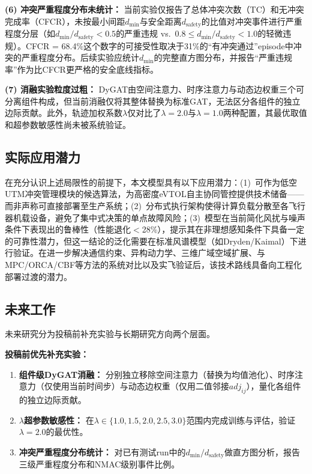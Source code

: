 \documentclass[12pt,a4paper,UTF8]{ctexart}
\begin{document}
\textbf{(6) 冲突严重程度分布未统计：} 当前实验仅报告了总体冲突次数（TC）和无冲突完成率（CFCR），未按最小间距$d_{\min}$与安全距离$d_{\text{safety}}$的比值对冲突事件进行严重程度分层（如$d_{\min}/d_{\text{safety}} < 0.5$的严重违规 vs.\ $0.8 \leq d_{\min}/d_{\text{safety}} < 1.0$的轻微违规）。CFCR = 68.4\%这个数字的可接受性取决于31\%的``有冲突通过''episode中冲突的严重程度分布。后续实验应统计$d_{\min}$的完整直方图分布，并报告``严重违规率''作为比CFCR更严格的安全底线指标。

\textbf{(7) 消融实验粒度过粗：} DyGAT由空间注意力、时序注意力与动态边权重三个可分离组件构成，但当前消融仅将其整体替换为标准GAT，无法区分各组件的独立边际贡献。此外，轨迹加权系数$\lambda$仅对比了$\lambda=2.0$与$\lambda=1.0$两种配置，其最优取值和超参数敏感性尚未被系统验证。

\subsection{实际应用潜力}

在充分认识上述局限性的前提下，本文模型具有以下应用潜力：(1)~可作为低空UTM冲突管理模块的候选算法，为高密度eVTOL自主协同管控提供技术储备——而非声称可直接部署至生产系统；(2)~分布式执行架构使得计算负载分散至各飞行器机载设备，避免了集中式决策的单点故障风险；(3)~模型在当前简化风扰与噪声条件下表现出的鲁棒性（性能退化$<$28\%），提示其在非理想感知条件下具备一定的可靠性潜力，但这一结论的泛化需要在标准风谱模型（如Dryden/Kaimal）下进行验证。在进一步解决通信约束、异构动力学、三维广域空域扩展、与MPC/ORCA/CBF等方法的系统对比以及实飞验证后，该技术路线具备向工程化部署过渡的潜力。

\subsection{未来工作}

未来研究分为投稿前补充实验与长期研究方向两个层面。

\textbf{投稿前优先补充实验：}
\begin{enumerate}[label=(\arabic*)]
    \item \textbf{组件级DyGAT消融：} 分别独立移除空间注意力（替换为均值池化）、时序注意力（仅使用当前时间步）与动态边权重（仅用二值邻接$adj_{ij}$），量化各组件的独立边际贡献。
    \item \textbf{$\lambda$超参数敏感性：} 在$\lambda \in \{1.0, 1.5, 2.0, 2.5, 3.0\}$范围内完成训练与评估，验证$\lambda=2.0$的最优性。
    \item \textbf{冲突严重程度分布统计：} 对已有测试run中的$d_{\min}/d_{\text{safety}}$做直方图分析，报告三级严重程度分布和NMAC级别事件比例。
\end{enumerate}
\end{document}
